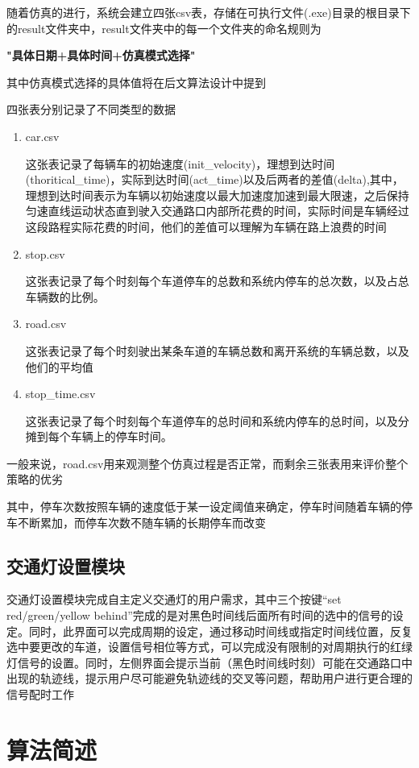 \documentclass[UTF8,a4paper]{ctexart}
\begin{document}
随着仿真的进行，系统会建立四张csv表，存储在可执行文件(.exe)目录的根目录下的result文件夹中，result文件夹中的每一个文件夹的命名规则为

\centerline{\textbf{"具体日期+具体时间+仿真模式选择"}}

其中仿真模式选择的具体值将在后文算法设计中提到

四张表分别记录了不同类型的数据
\begin{enumerate}
\item car.csv

这张表记录了每辆车的初始速度(init\_velocity)，理想到达时间(thoritical\_time)，实际到达时间(act\_time)以及后两者的差值(delta),其中，理想到达时间表示为车辆以初始速度以最大加速度加速到最大限速，之后保持匀速直线运动状态直到驶入交通路口内部所花费的时间，实际时间是车辆经过这段路程实际花费的时间，他们的差值可以理解为车辆在路上浪费的时间
\item stop.csv

这张表记录了每个时刻每个车道停车的总数和系统内停车的总次数，以及占总车辆数的比例。

\item road.csv

这张表记录了每个时刻驶出某条车道的车辆总数和离开系统的车辆总数，以及他们的平均值
\item stop\_time.csv

这张表记录了每个时刻每个车道停车的总时间和系统内停车的总时间，以及分摊到每个车辆上的停车时间。
\end{enumerate}

一般来说，road.csv用来观测整个仿真过程是否正常，而剩余三张表用来评价整个策略的优劣

其中，停车次数按照车辆的速度低于某一设定阈值来确定，停车时间随着车辆的停车不断累加，而停车次数不随车辆的长期停车而改变

\subsection{交通灯设置模块}

交通灯设置模块完成自主定义交通灯的用户需求，其中三个按键“set red/green/yellow behind”完成的是对黑色时间线后面所有时间的选中的信号的设定。同时，此界面可以完成周期的设定，通过移动时间线或指定时间线位置，反复选中要更改的车道，设置信号相位等方式，可以完成没有限制的对周期执行的红绿灯信号的设置。同时，左侧界面会提示当前（黑色时间线时刻）可能在交通路口中出现的轨迹线，提示用户尽可能避免轨迹线的交叉等问题，帮助用户进行更合理的信号配时工作
\section{算法简述}
\end{document}
